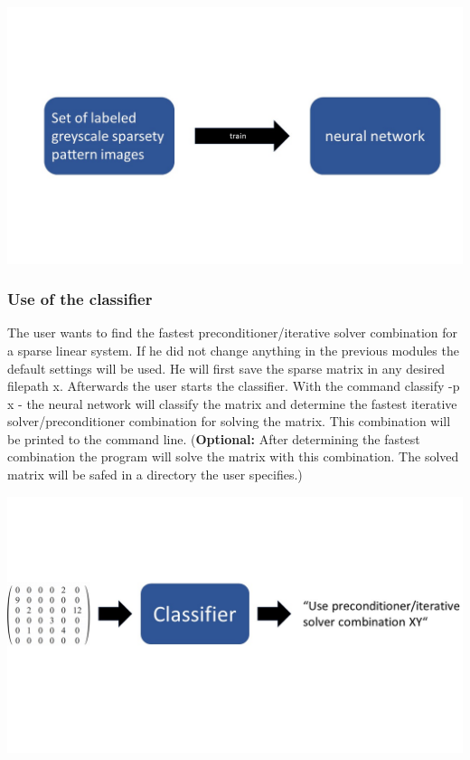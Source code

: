 \documentclass[parskip=full]{scrartcl}
\begin{document}
\begin{center}
\includegraphics[width=\textwidth]{trainingModule}
\end{center}

\subsubsection{Use of the classifier}

The user wants to find the fastest \gls{preconditioner}/\gls{iterative solver} combination for a sparse linear system. If he did not change anything in the previous modules the default settings will be used. He will first save the sparse matrix in any desired filepath x. Afterwards the user starts the \gls{classifier}.
With the command classify  -p x - the \gls{neural network} will classify the matrix and determine the fastest \gls{iterative solver}/\gls{preconditioner} combination for solving the matrix. This combination will be printed to the command line. (\textbf{Optional:} After determining the fastest combination the program will solve the matrix with this combination. The solved matrix will be safed in a directory the user specifies.)
\begin{center}
\includegraphics[width=\textwidth]{classifier}
\end{center}
\end{document}
